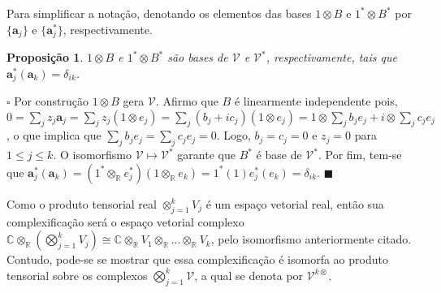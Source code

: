 \documentclass[12pt]{book}
\newtheorem{proposicao}[teorema]{Proposição}
\newenvironment{prova}[1]{$\square$ #1}{\hfill$\blacksquare$}
\newcommand{\complexificacaotensorial}[1]{\complexo{}\otimes_{\reta} #1}
\newcommand{\complexificado}[1]{\mathcal{#1}}
\newcommand{\complexificacaoelemento}[2]{#1\otimes_{\reta} #2}
\newcommand{\complexo}[1]{\mathbb{C}^{#1}}
\newcommand{\produtotensorialreal}[2]{\bigotimes_{j=1}^{#1} #2_{j}}
\newcommand{\real}[1]{\mathbb{R}^{#1}}
\newcommand{\reta}{\real{}}
\begin{document}
	Para simplificar a notação, denotando os elementos das bases $1\otimes B$ e $1^{*}\otimes B^{*}$ por $\{\textbf{a}_{j}\} $ e $\{\textbf{a}^{*}_{j}\}$, respectivamente.
	
	\begin{proposicao}\label{proposicao_base_complexificada}
		$1\otimes B$ e $1^{*}\otimes B^{*}$ são bases de $\complexificado{V}$ e $\complexificado{V}^{*}$, respectivamente, tais que $\textbf{a}^{*}_{j}(\textbf{a}_{k})=\delta_{ik}$.
	\end{proposicao}
	\begin{prova}
		Por construção $1\otimes B$ gera $\complexificado{V}$. Afirmo que $B$ é linearmente independente pois, $0=\sum_{j}z_{j}\textbf{a}_{j} = \sum_{j}z_{j}(1\otimes e_{j}) = \sum_{j}(b_{j} +ic_{j})(1\otimes e_{j}) = 1\otimes \sum_{j}b_{j}e_{j}+i\otimes \sum_{j}c_{j}e_{j}$, o que implica que $\sum_{j}b_{j}e_{j}=\sum_{j}c_{j}e_{j} = 0$. Logo, $b_{j}=c_{j}=0$  e $z_{j} = 0$ para $1\leq j\leq k$. O isomorfismo $\complexificado{V} \mapsto \complexificado{V}^{*}$ garante que $B^{*}$ é base de $\complexificado{V}^{*}$. Por fim, tem-se que $\textbf{a}^{*}_{j}(\textbf{a}_{k})=(\complexificacaoelemento{1^{*}}{e^{*}_{j}})(\complexificacaoelemento{1}{e_{k}}) = 1^{*}(1)e^{*}_{j}(e_{k}) = \delta_{ik}$.
	\end{prova}
	
	Como o produto tensorial real $\otimes_{j=1}^{k}V_{j}$ é um espaço vetorial real, então sua complexificação será o espaço vetorial complexo $\complexificacaotensorial{(\produtotensorialreal{k}{V})} \cong \complexificacaotensorial{V_{1} \otimes_{\reta} \dots \otimes_{\reta} V_{k}}$, pelo isomorfismo anteriormente citado. Contudo, pode-se se mostrar que essa complexificação é isomorfa ao produto tensorial sobre os complexos $\bigotimes^{k}_{j=1}\complexificado{V}$, a qual se denota por $\complexificado{V}^{k\otimes}$. 
	
\end{document}
